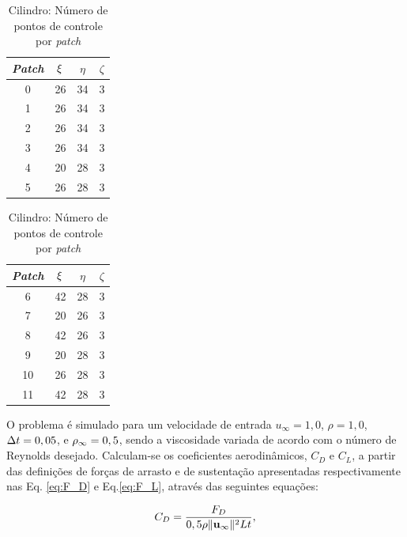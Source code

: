 \documentclass[tese_patricia]{subfiles}
\begin{document}
\begin{table}[h]
	\caption{Cilindro: Número de pontos de controle por \textit{patch}}
	\centering
	\begin{minipage}{0.49\textwidth}
		\centering
		\begin{tabular}{|c | c | c| c|} 
		\hline
		\textit{Patch} & $\xi$ & $\eta$ & $\zeta$\\ 
		\hline
		0 & 26 & 34 & 3\\
		\hline
		1 & 26 & 34 & 3\\
		\hline
		2 & 26 & 34 & 3\\
		\hline
		3 & 26 & 34 & 3\\
		\hline
		4 & 20 & 28 & 3\\
		\hline
		5 & 26 & 28 & 3\\ 
		\hline
		\end{tabular}
	\end{minipage}%
	\hspace{-3cm}  %
	\begin{minipage}{0.49\textwidth}
		\centering
		\begin{tabular}{|c | c | c| c|} 
		\hline
		\textit{Patch} & $\xi$ & $\eta$ & $\zeta$\\ 
		\hline
		6 & 42 & 28 & 3\\
		\hline
		7 & 20 & 26 & 3\\
		\hline
		8 & 42 & 26 & 3\\
		\hline
		9 & 20 & 28 & 3\\
		\hline
		10 & 26 & 28 & 3\\
		\hline
		11 & 42 & 28 & 3\\ 
		\hline
		\end{tabular}
		\label{tab:cilindro_discretização_patches}
	\end{minipage}
\end{table}


O problema é simulado para um velocidade de entrada $u_{\infty} = 1,0$, $\rho = 1,0$, $\Delta t = 0,05$, e $\rho_\infty = 0,5$, sendo a viscosidade variada de acordo com o número de Reynolds desejado.  Calculam-se os coeficientes aerodinâmicos, $C_{D}$ e $C_{L}$, a partir das definições de forças de arrasto e de sustentação apresentadas respectivamente nas Eq. \ref{eq:F_D} e Eq.\ref{eq:F_L}, através das seguintes equações:

\begin{align}
	C_D = \frac{F_D}{0,5\rho \lVert \mathbf{u}_{\infty} \lVert^{2} L t},
\end{align}
\end{document}

